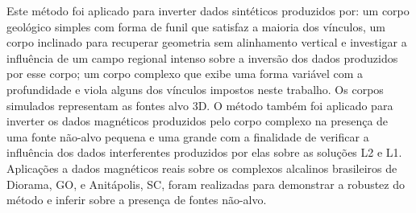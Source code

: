 Este método foi aplicado para inverter dados sintéticos produzidos por: um corpo geológico simples com forma de funil que satisfaz a maioria dos vínculos, um corpo inclinado para recuperar geometria sem alinhamento vertical e investigar a influência de um campo regional intenso sobre a inversão dos dados produzidos por esse corpo; um corpo complexo que exibe uma forma variável com a profundidade e viola alguns dos vínculos impostos neste trabalho.
Os corpos simulados representam as fontes alvo 3D.
O método também foi aplicado para inverter os dados magnéticos produzidos pelo corpo complexo na presença de uma fonte não-alvo pequena e uma grande com a finalidade de verificar a influência dos dados interferentes produzidos por elas sobre as soluções L2 e L1.
Aplicações a dados magnéticos reais sobre os complexos alcalinos brasileiros de Diorama, GO, e Anitápolis, SC, foram realizadas para demonstrar a robustez do método e inferir sobre a presença de fontes não-alvo.

